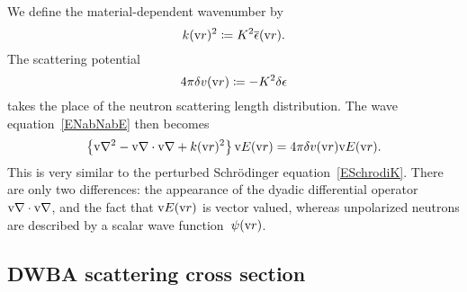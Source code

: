 %
We define the material-dependent wavenumber by
%
\begin{equation}
  k(\text{v}{r})^2 \coloneqq K^2 \overline{\epsilon}(\text{v}{r}).
\end{equation}
The scattering potential
%
\begin{equation}
  4\pi\delta v(\text{v}{r}) \coloneqq - K^2\delta\epsilon
\end{equation}
takes the place of the neutron scattering length distribution.
The wave equation~\cref{ENabNabE} then becomes
\begin{equation}\label{EwaveE3}
  \left\{\text{v}{\nabla}^2-\text{v}{\nabla}\cdot\text{v}{\nabla} + k(\text{v}{r})^2\right\}\text{v}{E}(\text{v}{r})
  = 4\pi\delta v(\text{v}{r})\text{v}{E}(\text{v}{r}).
\end{equation}
%
%
This is very similar to the perturbed Schrödinger equation~\cref{ESchrodiK}.
%
%
There are only two differences:
the appearance of the dyadic differential operator $\text{v}{\nabla}\cdot\text{v}{\nabla}$,
and the fact that $\text{v}{E}(\text{v}{r})$ is vector valued,
whereas unpolarized neutrons are described by a scalar wave function~$\psi(\text{v}{r})$.

\subsection{DWBA scattering cross section}\label{SXscasol}

\def\TD{\TENS{D}}
\def\TG{\TENS{G}}
\def\TDo{\TENS{\overset{o}{D}}}
\def\TGo{\TENS{\overset{o}{G}}}
\def\Ei{\v{E}_\si}
\def\Eic{\Ei^*}
\def\Ef{\v{E}_\sf}
\def\Efc{\Ef^*}
\def\Eo{\TENS{\overset{o}{\v{E}}}}
\def\Efo{\Eo_\sf}
\def\Efoc{\Eo\vphantom{E}^*_\sf}
\def\he{\v{\hat e}}
\def\hef{\he_\sf}
\def\hei{\he_\si}
\def\sif{\text{i,f}}

